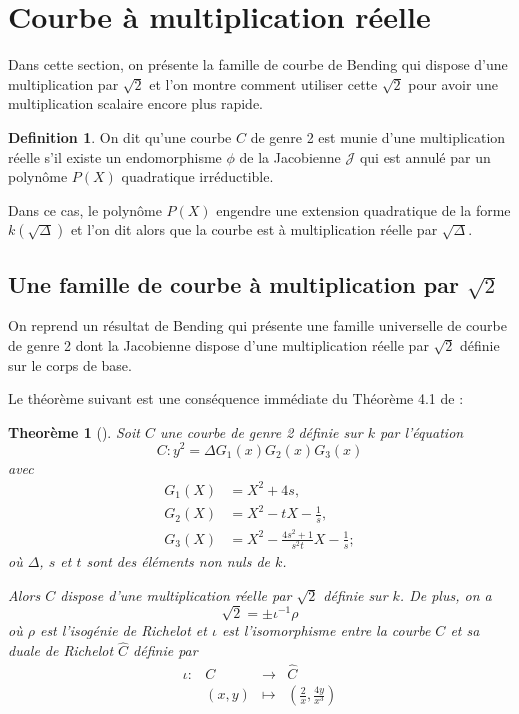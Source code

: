 \documentclass[a4paper,12pt]{article}
\newtheorem{theoreme}{Theorème}[section]
\theoremstyle{definition}
\newtheorem{definition}{Definition}[section]
\theoremstyle{remark}
\numberwithin{equation}{section}
\begin{document}
\section{Courbe à multiplication réelle}

Dans cette section, on présente la famille de courbe de Bending qui dispose d'une multiplication par $\sqrt{2}$ et l'on montre comment utiliser cette $\sqrt{2}$ pour avoir une multiplication scalaire encore plus rapide.

\begin{definition}
On dit qu'une courbe $C$ de genre 2 est munie d'une multiplication réelle s'il existe un endomorphisme $\phi$ de la Jacobienne $\mathcal{J}$ qui est annulé par un polynôme $P(X)$ quadratique irréductible.

Dans ce cas, le polynôme $P(X)$ engendre une extension quadratique de la forme $k(\sqrt\Delta)$ et l'on dit alors que la courbe est à multiplication réelle par $\sqrt\Delta$.
\end{definition}

\subsection{Une famille de courbe à multiplication par \texorpdfstring{$\sqrt{2}$}{sqrt2}}

On reprend un résultat de Bending qui présente une famille universelle de courbe de genre 2 dont la Jacobienne dispose d'une multiplication réelle par $\sqrt2$ définie sur le corps de base.

Le théorème suivant est une conséquence immédiate du Théorème 4.1 de \citep{bending} :
\begin{theoreme}[\citet{bending}]
\label{bending}
Soit $C$ une courbe de genre 2 définie sur $k$ par l'équation
$$C : y^2 = \Delta G_1(x)G_2(x)G_3(x)$$
avec
\begin{align*}
G_1(X) &= X^2 + 4s, \\
G_2(X) &= X^2 - tX - \frac{1}{s}, \\
G_3(X) &= X^2 - \frac{4s^2+1}{s^2t}X - \frac{1}{s};
\end{align*}
où $\Delta$, $s$ et $t$ sont des éléments non nuls de $k$.

Alors $C$ dispose d'une multiplication réelle par $\sqrt2$ définie sur $k$. De plus, on a
$$\sqrt{2} = \pm \iota^{-1}\rho$$
où $\rho$ est l'isogénie de Richelot et $\iota$ est l'isomorphisme entre la courbe $C$ et sa duale de Richelot $\hat{C}$ définie par
\begin{equation*}
\begin{array}{lrcl}
\iota :&C & \longrightarrow & \hat{C} \\
& (x,y) & \longmapsto & (\frac{2}{x},\frac{4y}{x^3})
\end{array}
\end{equation*}
%
\end{theoreme}
\end{document}
